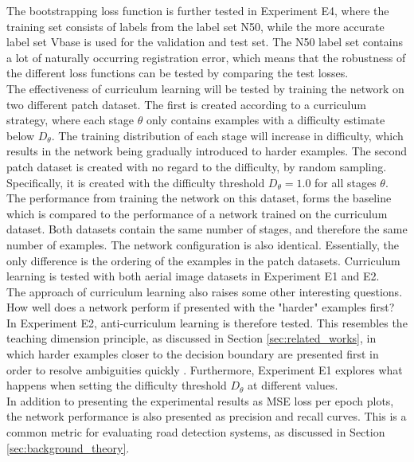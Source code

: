 The bootstrapping loss function is further tested in Experiment E4, where the training set consists of labels from the label set N50, while the more accurate label set Vbase is used for the validation and test set. The N50 label set contains a lot of naturally occurring registration error, which means that the robustness of the different loss functions can be tested by comparing the test losses.\\

The effectiveness of curriculum learning will be tested by training the network on two different patch dataset. The first is created according to a curriculum strategy, where each stage $\theta$ only contains examples with a difficulty estimate below $D_\theta$. The training distribution of each stage will increase in difficulty, which results in the network being gradually introduced to harder examples. The second patch dataset is created with no regard to the difficulty, by random sampling. Specifically, it is created with the difficulty threshold $D_\theta =1.0$ for all stages $\theta$. The performance from training the network on this dataset, forms the baseline which is compared to the performance of a network trained on the curriculum dataset. Both datasets contain the same number of stages, and therefore the same number of examples. The network configuration is also identical. Essentially, the only difference is the ordering of the examples in the patch datasets. Curriculum learning is tested with both aerial image datasets in Experiment E1 and E2.\\

The approach of curriculum learning also raises some other interesting questions. How well does a network perform if presented with the "harder" examples first? In Experiment E2, anti-curriculum learning is therefore tested. This resembles the teaching dimension principle, as discussed in Section \ref{sec:related_works}, in which harder examples closer to the decision boundary are presented first in order to resolve ambiguities quickly . Furthermore, Experiment E1 explores what happens when setting the difficulty threshold $D_\theta$ at different values.\\

In addition to presenting the experimental results as \ac{MSE} loss per epoch plots, the network performance is also presented as precision and recall curves. This is a common metric for evaluating road detection systems, as discussed in Section \ref{sec:background_theory}.\\


